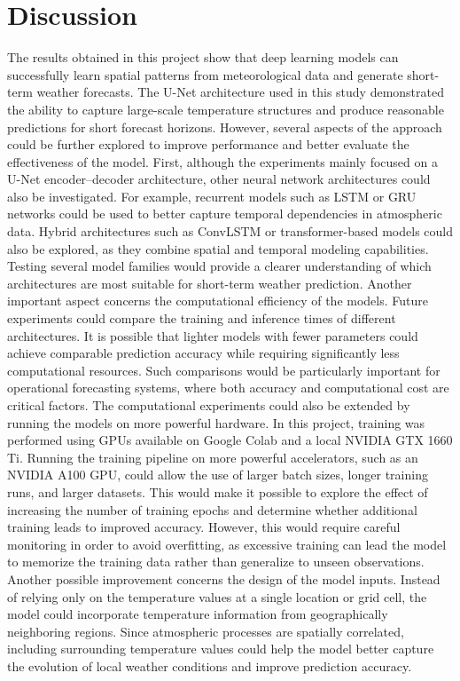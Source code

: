 \chapter{Discussion}
\label{chap:Discussion}

The results obtained in this project show that deep learning models can successfully learn spatial patterns from meteorological data and generate short-term weather forecasts. The U-Net architecture used in this study demonstrated the ability to capture large-scale temperature structures and produce reasonable predictions for short forecast horizons. However, several aspects of the approach could be further explored to improve performance and better evaluate the effectiveness of the model.
First, although the experiments mainly focused on a U-Net encoder–decoder architecture, other neural network architectures could also be investigated. For example, recurrent models such as LSTM or GRU networks could be used to better capture temporal dependencies in atmospheric data. Hybrid architectures such as ConvLSTM or transformer-based models could also be explored, as they combine spatial and temporal modeling capabilities. Testing several model families would provide a clearer understanding of which architectures are most suitable for short-term weather prediction.
Another important aspect concerns the computational efficiency of the models. Future experiments could compare the training and inference times of different architectures. It is possible that lighter models with fewer parameters could achieve comparable prediction accuracy while requiring significantly less computational resources. Such comparisons would be particularly important for operational forecasting systems, where both accuracy and computational cost are critical factors.
The computational experiments could also be extended by running the models on more powerful hardware. In this project, training was performed using GPUs available on Google Colab and a local NVIDIA GTX 1660 Ti. Running the training pipeline on more powerful accelerators, such as an NVIDIA A100 GPU, could allow the use of larger batch sizes, longer training runs, and larger datasets. This would make it possible to explore the effect of increasing the number of training epochs and determine whether additional training leads to improved accuracy. However, this would require careful monitoring in order to avoid overfitting, as excessive training can lead the model to memorize the training data rather than generalize to unseen observations.
Another possible improvement concerns the design of the model inputs. Instead of relying only on the temperature values at a single location or grid cell, the model could incorporate temperature information from geographically neighboring regions. Since atmospheric processes are spatially correlated, including surrounding temperature values could help the model better capture the evolution of local weather conditions and improve prediction accuracy.
